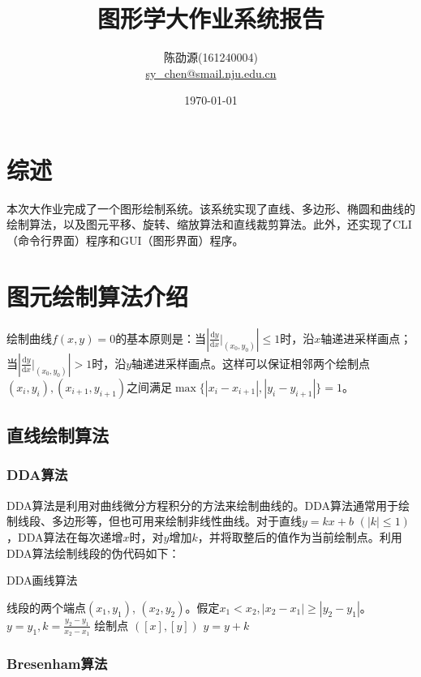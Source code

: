 \documentclass[a4paper,12pt]{article}
\title{图形学大作业系统报告}
\author{陈劭源(161240004) \\ \href{mailto:sy_chen@smail.nju.edu.cn}{sy\_chen@smail.nju.edu.cn}}
\date{\today}
\begin{document}
\maketitle
\tableofcontents

\section{综述}
本次大作业完成了一个图形绘制系统。该系统实现了直线、多边形、椭圆和曲线的绘制算法，以及图元平移、旋转、缩放算法和直线裁剪算法。此外，还实现了CLI（命令行界面）程序和GUI（图形界面）程序。

\section{图元绘制算法介绍}
绘制曲线$f(x,y) = 0$的基本原则是：当$\left|\frac{\mathrm{d}y}{\mathrm{d}x} \big|_{(x_0, y_0)} \right| \leq 1$时，沿$x$轴递进采样画点；当$\left|\frac{\mathrm{d}y}{\mathrm{d}x} \big|_{(x_0, y_0)} \right| > 1$时，沿$y$轴递进采样画点。这样可以保证相邻两个绘制点$(x_i, y_i), (x_{i+1}, y_{i+1})$之间满足$\max\{|x_i - x_{i+1}|, |y_i - y_{i+1}|\} = 1$。

\subsection{直线绘制算法}

\subsubsection{DDA算法}

DDA算法是利用对曲线微分方程积分的方法来绘制曲线的。DDA算法通常用于绘制线段、多边形等，但也可用来绘制非线性曲线\cite{wiki:DDA}。对于直线$y = kx + b$ $(|k| \leq 1)$，DDA算法在每次递增$x$时，对$y$增加$k$，并将取整后的值作为当前绘制点。利用DDA算法绘制线段的伪代码如下：

\begin{algorithm}[htb] 
\caption{DDA画线算法} 
\label{alg:DDA} 
\begin{algorithmic}[1] 
\Require 
线段的两个端点$(x_1, y_1)$, $(x_2, y_2)$。假定$x_1 < x_2, |x_2 - x_1| \geq |y_2 - y_1|$。
\State $y = y_1, k = \frac{y_2 - y_1}{x_2 - x_1}$
    \State 绘制点 $([x], [y])$
    \State $y = y + k$
\EndFor
\end{algorithmic} 
\end{algorithm}

\subsubsection{Bresenham算法}
\end{document}
